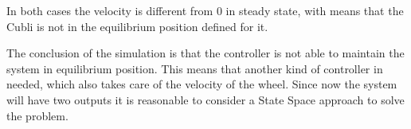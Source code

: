 In both cases the velocity is different from 0 in steady state, with means that the Cubli is not in the equilibrium position defined for it. 

The conclusion of the simulation is that the controller is not able to maintain the system in equilibrium position. This means that another kind of controller in needed, which also takes care of the velocity of the wheel. Since now the system will have two outputs it is reasonable to consider a State Space approach to solve the problem.

%
%
%
% 

